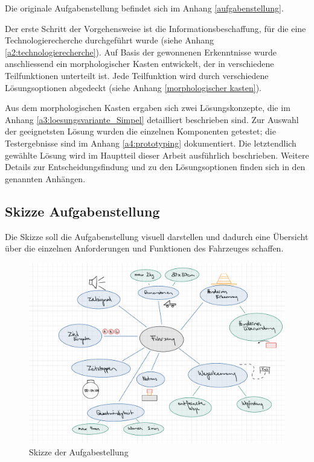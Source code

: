 \documentclass[../main.tex]{subfiles}
\begin{document}
Die originale Aufgabenstellung befindet sich im Anhang \ref{aufgabenstellung}.
\newpage

Der erste Schritt der Vorgehensweise ist die Informationsbeschaffung, für die eine Technologierecherche durchgeführt wurde (siehe Anhang \ref{a2:technologierecherche}). Auf Basis der gewonnenen Erkenntnisse wurde anschliessend ein morphologischer Kasten entwickelt, der in verschiedene Teilfunktionen unterteilt ist. Jede Teilfunktion wird durch verschiedene Lösungsoptionen abgedeckt (siehe Anhang \ref{morphologischer kasten}).

Aus dem morphologischen Kasten ergaben sich zwei Lösungskonzepte, die im Anhang \ref{a3:loesungsvariante_Simpel} detailliert beschrieben sind. Zur Auswahl der geeignetsten Lösung wurden die einzelnen Komponenten getestet; die Testergebnisse sind im Anhang \ref{a4:prototyping} dokumentiert. Die letztendlich gewählte Lösung wird im Hauptteil dieser Arbeit ausführlich beschrieben. Weitere Details zur Entscheidungsfindung und zu den Lösungsoptionen finden sich in den genannten Anhängen.


\subsection{Skizze Aufgabenstellung}
Die Skizze soll die Aufgabenstellung visuell darstellen und dadurch eine  Übersicht über die einzelnen Anforderungen und Funktionen des Fahrzeuges schaffen.
    \begin{figure}[H]
        \includegraphics[width=\textwidth]{assets/Skizze_Aufgabenstellung.pdf}
        \caption{Skizze der Aufgabestellung}
        \label{img:Skizze_Aufgabenstellung}
    \end{figure} 
 
\end{document}
